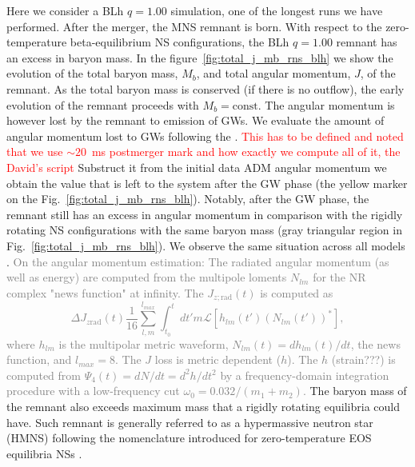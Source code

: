 \documentclass[11pt,a4paper,headinclude=true,DIV=14,BCOR=8mm,chapterprefix,listof=totoc,twoside,openright,abstracton]{scrbook}
\newcommand{\red}[1]{\textcolor{red}{#1}}
\newcommand{\gray}[1]{\textcolor{gray}{#1}}
\begin{document}
Here we consider a BLh $q=1.00$ simulation, one of the longest runs we have performed.
After the merger, the \ac{MNS} remnant is born. With respect to the zero-temperature 
beta-equilibrium \ac{NS} configurations, the BLh $q=1.00$ 
remnant has an excess in baryon mass.
In the figure~\ref{fig:total_j_mb_rns_blh} we show the evolution of the 
total baryon mass, $M_b$, and total angular momentum, $J$, of the remnant.
As the total baryon mass is conserved (if there is no outflow), the early evolution 
of the remnant proceeds with $M_b=\text{const}$. The angular momentum is however 
lost by the remnant to emission of \acp{GW}. 
We evaluate the amount of angular momentum lost to \acp{GW} following the 
\citet{Damour:2011fu,Bernuzzi:2012ci,Bernuzzi:2015rla}.
\red{This has to be defined and noted that we use $\sim20$~ms postmerger mark
    and how exactly we compute all of it, the David's script
}
Substruct it from the initial data \ac{ADM} angular momentum we obtain the value 
that is left to the system after the \ac{GW} phase 
(the yellow marker on the Fig.~\ref{fig:total_j_mb_rns_blh}).
Notably, after the \ac{GW} phase, the remnant still has an excess in angular momentum
in comparison with the rigidly rotating \ac{NS} configurations with the same baryon mass 
(gray triangular region in Fig.~\ref{fig:total_j_mb_rns_blh}).
We observe the same situation across all models \citep{Zappa:2017xba,Radice:2018xqa}.
\gray{
    On the angular momentum estimation:
    The radiated angular momentum (as well as energy) are computed from the 
    multipole loments $N_{lm}$ for the \ac{NR} complex "news function" at infinity. 
    The $J_{z;\text{rad}}(t)$ is computed as \citep{Damour:2011fu} 
    \begin{equation}
        \Delta J_{z\text{rad}}(t) \frac{1}{16}\sum_{l,m}^{l_{max}}\int_{t_0}^{t} dt' m \mathcal{L}[h_{lm}(t')(N_{lm}(t'))^*],
    \end{equation}
    where $h_{lm}$ is the multipolar metric waveform, 
    $N_{lm}(t) = dh_{lm}(t) / dt$, the news function, and $l_{max}=8$.
    The $J$ loss is metric dependent ($h$).
    The $h$ (strain???) is computed from $\Psi_4(t) = dN/dt = d^2h/dt^2$ by a 
    frequency-domain integration procedure with a low-frequency cut 
    $\omega_0 = 0.032/(m_1+m_2)$.
}
The baryon mass of the remnant also exceeds maximum mass that a rigidly rotating 
equilibria could have.
Such remnant is generally referred to as a hypermassive neutron star (HMNS) following the 
nomenclature introduced for zero-temperature EOS equilibria \acp{NS} \citep{Baumgarte:1999cq}.
\end{document}

